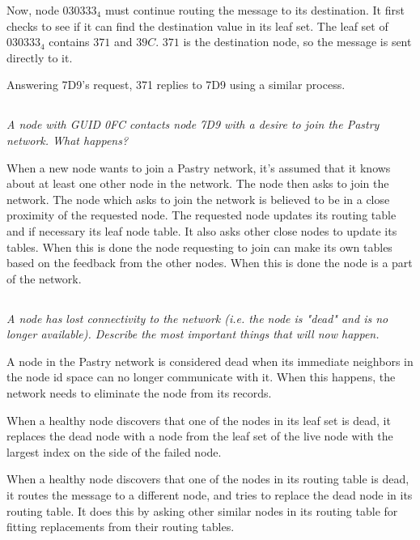 \documentclass{article}
\newcommand{\question}[1]{\subsection{}\textit{#1}\bigskip}
\begin{document}
Now, node $ 030333_4 $ must continue routing the message to its destination.
It first checks to see if it can find the destination value in its leaf set.
The leaf set of $ 030333_4 $ contains $ 371 $ and $ 39C $.
$ 371 $ is the destination node, so the message is sent directly to it.

Answering 7D9's request, 371 replies to 7D9 using a similar process.


\question{A node with GUID 0FC contacts node 7D9 with a desire to join the Pastry network. What happens?}

When a new node wants to join a Pastry network, it's assumed that it knows about at least one other node in the network. The node then asks to join the network.
The node which asks to join the network is believed to be in a close proximity of the requested node.
The requested node updates its routing table and if necessary its leaf node table. It also asks other close nodes to update its tables.
When this is done the node requesting to join can make its own tables based on the feedback from the other nodes.
When this is done the node is a part of the network.

\question{A node has lost connectivity to the network (i.e. the node is "dead" and is no longer available). Describe the most important things that will now happen.}

A node in the Pastry network is considered dead when its immediate neighbors in the node id space can no longer communicate with it.
When this happens, the network needs to eliminate the node from its records.

When a healthy node discovers that one of the nodes in its leaf set is dead, it replaces the dead node with a node from the leaf set of the live node with the largest index on the side of the failed node.

When a healthy node discovers that one of the nodes in its routing table is dead, it routes the message to a different node, and tries to replace the dead node in its routing table.
It does this by asking other similar nodes in its routing table for fitting replacements from their routing tables.
\end{document}
